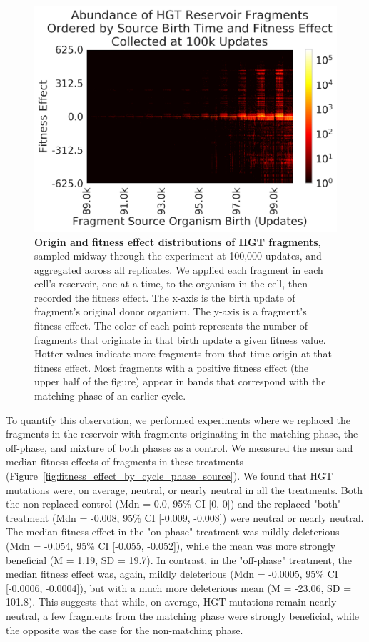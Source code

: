 \documentclass[letterpaper]{article}
\begin{document}
	\begin{figure}[h!]
	\begin{center}
	\includegraphics[width=0.75\columnwidth]{figures/fitness_effect_heatmap.png}
	\caption{\textbf{Origin and fitness effect distributions of HGT fragments}, sampled midway through the experiment at 100,000 updates, and aggregated across all replicates. We applied each fragment in each cell's reservoir, one at a time, to the organism in the cell, then recorded the fitness effect. The x-axis is the birth update of fragment's original donor organism. The y-axis is a fragment's fitness effect. The color of each point represents the number of fragments that originate in that birth update a given fitness value. Hotter values indicate more fragments from that time origin at that fitness effect. Most fragments with a positive fitness effect (the upper half of the figure) appear in bands that correspond with the matching phase of an earlier cycle. 
	}\label{fig:fitness_effect_heatmap}
	\end{center}
	\end{figure}


To quantify this observation, we performed experiments where we replaced the fragments in the reservoir with fragments originating in the matching phase, the off-phase, and mixture of both phases as a control. We measured the mean and median fitness effects of fragments in these treatments (Figure~\ref{fig:fitness_effect_by_cycle_phase_source}). We found that HGT mutations were, on average, neutral, or nearly neutral in all the treatments. Both the non-replaced control (Mdn = 0.0, 95\% CI [0, 0]) and the replaced-"both" treatment (Mdn = -0.008, 95\% CI [-0.009, -0.008]) were neutral or nearly neutral. The median fitness effect in the "on-phase" treatment was mildly deleterious (Mdn = -0.054, 95\% CI [-0.055, -0.052]), while the mean was more strongly beneficial (M = 1.19, SD = 19.7). In contrast, in the "off-phase" treatment, the median fitness effect was, again, mildly deleterious (Mdn = -0.0005, 95\% CI [-0.0006, -0.0004]), but with a much more deleterious mean (M = -23.06, SD = 101.8). This suggests that while, on average, HGT mutations remain nearly neutral, a few fragments from the matching phase were strongly beneficial, while the opposite was the case for the non-matching phase.
\end{document}
